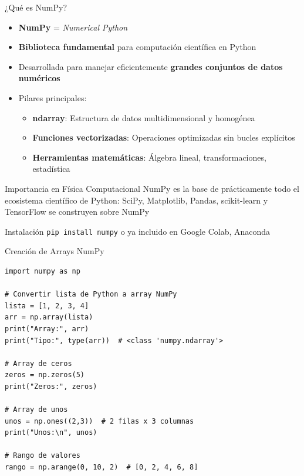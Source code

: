 \documentclass[10pt]{beamer}
\begin{document}
\begin{frame}{¿Qué es NumPy?}
  \footnotesize
  \begin{itemize}
    \item \textbf{NumPy} = \textit{Numerical Python}
    \item \textbf{Biblioteca fundamental} para computación científica en Python
    \item Desarrollada para manejar eficientemente \textbf{grandes conjuntos de datos numéricos}
    \item Pilares principales:
      \begin{itemize}
        \item \textbf{ndarray}: Estructura de datos multidimensional y homogénea
        \item \textbf{Funciones vectorizadas}: Operaciones optimizadas sin bucles explícitos
        \item \textbf{Herramientas matemáticas}: Álgebra lineal, transformaciones, estadística
      \end{itemize}
  \end{itemize}

  \begin{alertblock}{Importancia en Física Computacional}
    NumPy es la base de prácticamente todo el ecosistema científico de Python: SciPy, Matplotlib, Pandas, scikit-learn y TensorFlow se construyen sobre NumPy
  \end{alertblock}
  
  \begin{block}{Instalación}
    \texttt{pip install numpy} o ya incluido en Google Colab, Anaconda
  \end{block}
\end{frame}


\begin{frame}[fragile]{Creación de Arrays NumPy}
\begin{verbatim}
import numpy as np

# Convertir lista de Python a array NumPy
lista = [1, 2, 3, 4]
arr = np.array(lista)
print("Array:", arr)
print("Tipo:", type(arr))  # <class 'numpy.ndarray'>

# Array de ceros
zeros = np.zeros(5)
print("Zeros:", zeros)

# Array de unos
unos = np.ones((2,3))  # 2 filas x 3 columnas
print("Unos:\n", unos)

# Rango de valores
rango = np.arange(0, 10, 2)  # [0, 2, 4, 6, 8]
\end{verbatim}
\end{frame}
\end{document}
